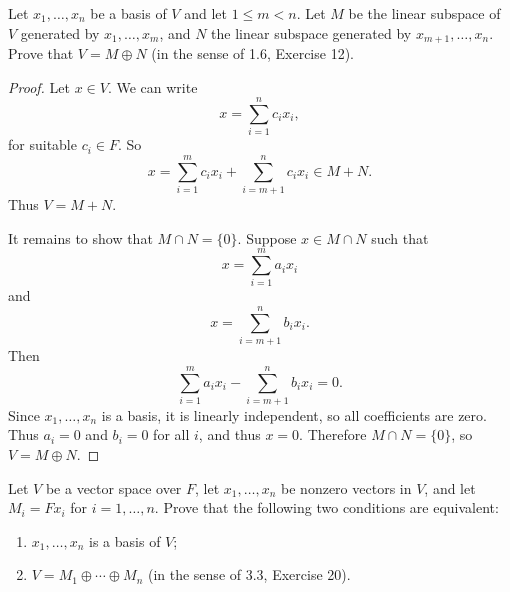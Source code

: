 \begin{tcolorbox}[title=Problem 11, breakable]
    Let $x_1, \ldots, x_n$ be a basis of $V$ and let $1 \le m < n$.
    Let $M$ be the linear subspace of $V$ generated by $x_1, \ldots, x_m$, 
    and $N$ the linear subspace generated by $x_{m + 1}, \ldots, x_n$. Prove that 
    $V = M \oplus N$ (in the sense of 1.6, Exercise 12).
\end{tcolorbox}

\begin{proof}
    Let $x \in V$. We can write 
    \[x = \sum_{i=1}^n c_i x_i,\]
    for suitable $c_i \in F$.
    So 
    \[
    x = \sum_{i=1}^m c_i x_i + \sum_{i=m+1}^n c_i x_i \in M + N.
    \]
    Thus $V = M + N$.

    It remains to show that $M \cap N = \{0\}$.
    Suppose $x \in  M \cap N$ such that 
    \[
    x=\sum_{i=1}^m a_i x_i
    \]
    and
    \[
    x=\sum_{i=m+1}^n b_i x_i.
    \]
    Then
    \[
    \sum_{i=1}^m a_i x_i-\sum_{i=m+1}^n b_i x_i=0.
    \]
    Since $x_1,\ldots,x_n$ is a basis, it is linearly independent, so all
    coefficients are zero. Thus $a_i=0$ and $b_i=0$ for all $i$, and thus
    $x=0$.
    Therefore $M \cap N=\{0\}$, so $V=M\oplus N$.
\end{proof}


\begin{tcolorbox}[title=Problem 12, breakable]
    Let $V$  be a vector space over $F$,
    let $x_1, \ldots, x_n$ be nonzero vectors in $V$,
    and let $M_i = F x_i$ for $i = 1, \ldots, n$.
    Prove that the following two conditions are equivalent:
    \begin{enumerate}
        \item $x_1, \ldots, x_n$ is a basis of $V$;
        \item $V = M_1 \oplus \cdots \oplus M_n$ (in the sense of 3.3, Exercise 20).
    \end{enumerate}
\end{tcolorbox}

